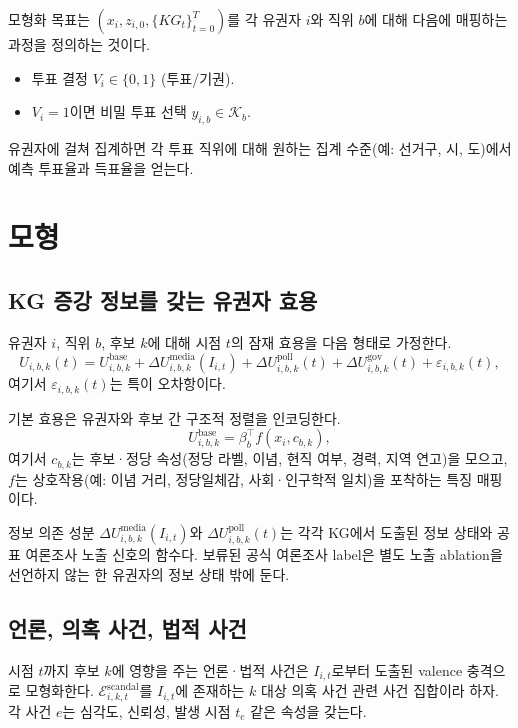 \documentclass[11pt]{article}
\begin{document}
모형화 목표는 $(x_i, z_{i,0}, \{KG_t\}_{t=0}^T)$를 각 유권자 $i$와 직위 $b$에 대해 다음에 매핑하는 과정을 정의하는 것이다.

\begin{itemize}
  \item 투표 결정 $V_i \in \{0,1\}$ (투표/기권).
  \item $V_i = 1$이면 비밀 투표 선택 $y_{i,b} \in \mathcal{K}_b$.
\end{itemize}

유권자에 걸쳐 집계하면 각 투표 직위에 대해 원하는 집계 수준(예: 선거구, 시, 도)에서 예측 투표율과 득표율을 얻는다.

\section{모형}

\subsection{KG 증강 정보를 갖는 유권자 효용}

유권자 $i$, 직위 $b$, 후보 $k$에 대해 시점 $t$의 잠재 효용을 다음 형태로 가정한다.
\begin{equation}
U_{i,b,k}(t) = U^{\text{base}}_{i,b,k} + \Delta U^{\text{media}}_{i,b,k}(I_{i,t}) + \Delta U^{\text{poll}}_{i,b,k}(t) + \Delta U^{\text{gov}}_{i,b,k}(t) + \varepsilon_{i,b,k}(t),
\end{equation}
여기서 $\varepsilon_{i,b,k}(t)$는 특이 오차항이다.

기본 효용은 유권자와 후보 간 구조적 정렬을 인코딩한다.
\begin{equation}
U^{\text{base}}_{i,b,k} = \beta_b^\top f(x_i, c_{b,k}),
\end{equation}
여기서 $c_{b,k}$는 후보·정당 속성(정당 라벨, 이념, 현직 여부, 경력, 지역 연고)을 모으고, $f$는 상호작용(예: 이념 거리, 정당일체감, 사회·인구학적 일치)을 포착하는 특징 매핑이다.

정보 의존 성분 $\Delta U^{\text{media}}_{i,b,k}(I_{i,t})$와 $\Delta U^{\text{poll}}_{i,b,k}(t)$는 각각 KG에서 도출된 정보 상태와 공표 여론조사 노출 신호의 함수다. 보류된 공식 여론조사 label은 별도 노출 ablation을 선언하지 않는 한 유권자의 정보 상태 밖에 둔다.

\subsection{언론, 의혹 사건, 법적 사건}

시점 $t$까지 후보 $k$에 영향을 주는 언론·법적 사건은 $I_{i,t}$로부터 도출된 valence 충격으로 모형화한다. $\mathcal{E}^{\text{scandal}}_{i,k,t}$를 $I_{i,t}$에 존재하는 $k$ 대상 의혹 사건 관련 사건 집합이라 하자. 각 사건 $e$는 심각도, 신뢰성, 발생 시점 $t_e$ 같은 속성을 갖는다.
\end{document}
